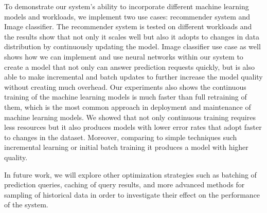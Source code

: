 \documentclass{vldb}
\begin{document}
To demonstrate our system's ability to incorporate different machine learning models and workloads, we implement two use cases: recommender system and Image classifier.
The recommender system is tested on different workloads and the results show that not only it scales well but also it adopts to changes in data distribution by continuously updating the model.
Image classifier use case as well shows how we can implement and use neural networks within our system to create a model that not only can answer prediction requests quickly, but is also able to make incremental and batch updates to further increase the model quality without creating much overhead.
Our experiments also shows the continuous training of the machine learning models is much faster than full retraining of them, which is the most common approach in deployment and maintenance of machine learning models. We showed that not only continuous training requires less resources but it also produces models with lower error rates that adopt faster to changes in the dataset.
Moreover, comparing to simple techniques such incremental learning or initial batch training it produces a model with higher quality.

In future work, we will explore other optimization strategies such as batching of prediction queries, caching of query results, and more advanced methods for sampling of historical data in order to investigate their effect on the performance of the system.


\end{document}
